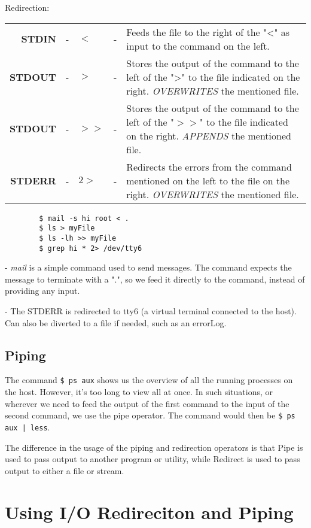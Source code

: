 \documentclass{report}
\begin{document}
	\noindent
	Redirection:
	
	\noindent
	\begin{tabular}{rclcp{}}
		\textbf{STDIN} &- &$<$ &- &Feeds the file to the right of the "<" as input to the command on the left. \\
		\textbf{STDOUT} &- &$>$ &- &Stores the output of the command to the left of the ">" to the file indicated on the right. \textit{OVERWRITES} the mentioned file.\\
		\textbf{STDOUT} &- &$>>$ &- &Stores the output of the command to the left of the "$>>$" to the file indicated on the right. \textit{APPENDS} the mentioned file.\\
		\textbf{STDERR} &- &$2>$ &- &Redirects the errors from the command mentioned on the left to the file on the right. \textit{OVERWRITES} the mentioned file.\\
	\end{tabular}
		
	\noindent
	\begin{verbatim}	
		$ mail -s hi root < .
		$ ls > myFile
		$ ls -lh >> myFile
		$ grep hi * 2> /dev/tty6
	\end{verbatim}
	
	 - \textit{mail} is a simple command used to send messages. The command expects the message to terminate with a ".", so we feed it directly to the command, instead of providing any input.
	
	 - The STDERR is redirected to tty6 (a virtual terminal connected to the host). Can also be diverted to a file if needed, such as an errorLog.
	
	\subsection{Piping}
	The command \verb|$ ps aux| shows us the overview of all the running processes on the host. However, it's too long to view all at once. In such situations, or wherever we need to feed the output of the first command to the input of the second command, we use the pipe operator. The command would then be \verb=$ ps aux | less=.
	
	The difference in the usage of the piping and redirection operators is that Pipe is used to pass output to another program or utility, while Redirect is used to pass output to either a file or stream.
	
	\section{Using I/O Redireciton and Piping}
	
\end{document}
